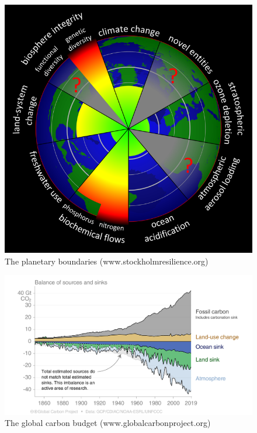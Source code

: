 \documentclass[
  oneside]{book}
\begin{document}
\begin{figure}

{\centering \includegraphics[width=0.8\linewidth]{figures/chap1/planetary_boundaries} 

}

\caption{The planetary boundaries (www.stockholmresilience.org)}\label{fig:f1}
\end{figure}

\begin{figure}

{\centering \includegraphics[width=0.8\linewidth]{figures/chap1/carbon_budget} 

}

\caption{The global carbon budget (www.globalcarbonproject.org)}\label{fig:f2}
\end{figure}
\end{document}
